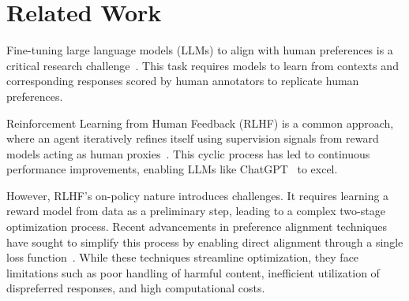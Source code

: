\section{Related Work}
\label{sec:rel}

Fine-tuning large language models (LLMs) to align with human preferences is a critical research challenge~\cite{stiennon2020learning,  ouyang2022training}. This task requires models to learn from contexts and corresponding responses scored by human annotators to replicate human  preferences.  

 


Reinforcement Learning from Human Feedback (RLHF) is a common approach, where an agent iteratively refines itself using supervision signals from reward models acting as human proxies~\cite{rlhfpipeline, ouyang2022training, dai2023safe, christiano2017deep, stiennon2020learning, principled, lee2021pebble, nakano2021webgpt, snell2022offline}. This cyclic process has led to continuous performance improvements, enabling LLMs like ChatGPT~\cite{gpt4, llama3} to excel.  

 

However, RLHF’s on-policy nature introduces challenges. It requires learning a reward model from data as a preliminary step, leading to a complex two-stage optimization process. Recent advancements in preference alignment techniques have sought to simplify this process by enabling direct alignment through a single loss function~\cite{dpo, rdpo, ipo, sppo, simpo, kto, exo, nca, pro}. While these techniques streamline optimization, they face limitations such as poor handling of harmful content, inefficient utilization of dispreferred responses, and high computational costs.

